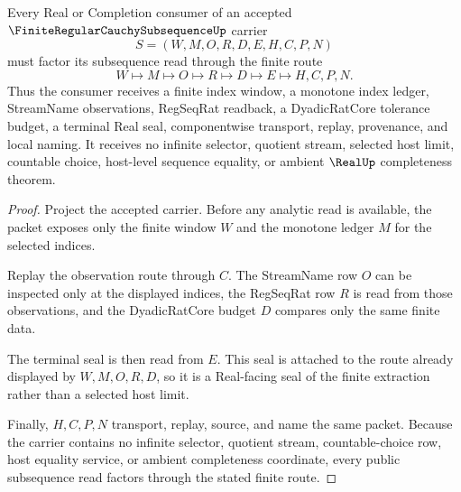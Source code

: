 \begin{theorem}
\label{thm:finite-regular-cauchy-subsequence-extraction-route}
Every Real or Completion consumer of an accepted $\FiniteRegularCauchySubsequenceUp$ carrier
$$
S=(W,M,O,R,D,E,H,C,P,N)
$$
must factor its subsequence read through the finite route
$$
W \longmapsto M \longmapsto O \longmapsto R \longmapsto D \longmapsto E \longmapsto H,C,P,N .
$$
Thus the consumer receives a finite index window, a monotone index ledger, StreamName observations, RegSeqRat readback, a DyadicRatCore tolerance budget, a terminal Real seal, componentwise transport, replay, provenance, and local naming. It receives no infinite selector, quotient stream, selected host limit, countable choice, host-level sequence equality, or ambient $\RealUp$ completeness theorem.
\end{theorem}
\begin{proof}
Project the accepted carrier. Before any analytic read is available, the packet exposes only the finite window $W$ and the monotone ledger $M$ for the selected indices.

Replay the observation route through $C$. The StreamName row $O$ can be inspected only at the displayed indices, the RegSeqRat row $R$ is read from those observations, and the DyadicRatCore budget $D$ compares only the same finite data.

The terminal seal is then read from $E$. This seal is attached to the route already displayed by $W,M,O,R,D$, so it is a Real-facing seal of the finite extraction rather than a selected host limit.

Finally, $H,C,P,N$ transport, replay, source, and name the same packet. Because the carrier contains no infinite selector, quotient stream, countable-choice row, host equality service, or ambient completeness coordinate, every public subsequence read factors through the stated finite route.
\end{proof}



